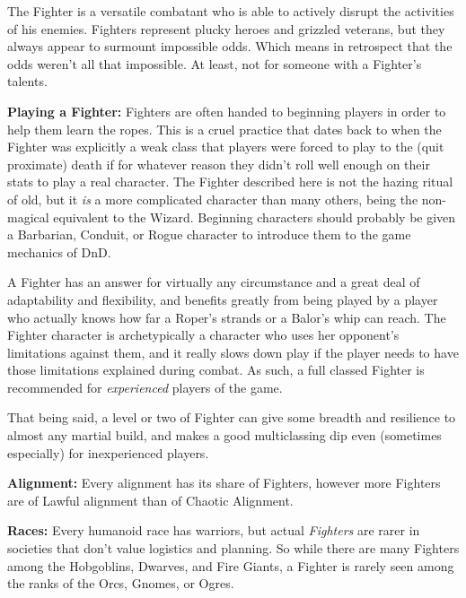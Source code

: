 
The Fighter is a versatile combatant who is able to actively disrupt the activities of his enemies. Fighters represent plucky heroes and grizzled veterans, but they always appear to surmount impossible odds. Which means in retrospect that the odds weren't all that impossible. At least, not for someone with a Fighter's talents.

\textbf{Playing a Fighter:} Fighters are often handed to beginning players in order to help them learn the ropes. This is a cruel practice that dates back to when the Fighter was explicitly a weak class that players were forced to play to the (quit proximate) death if for whatever reason they didn't roll well enough on their stats to play a real character. The Fighter described here is not the hazing ritual of old, but it \textit{is} a more complicated character than many others, being the non-magical equivalent to the Wizard. Beginning characters should probably be given a Barbarian, Conduit, or Rogue character to introduce them to the game mechanics of DnD.

A Fighter has an answer for virtually any circumstance and a great deal of adaptability and flexibility, and benefits greatly from being played by a player who actually knows how far a Roper's strands or a Balor's whip can reach. The Fighter character is archetypically a character who uses her opponent's limitations against them, and it really slows down play if the player needs to have those limitations explained during combat. As such, a full classed Fighter is recommended for \textit{experienced} players of the game.

That being said, a level or two of Fighter can give some breadth and resilience to almost any martial build, and makes a good multiclassing dip even (sometimes especially) for inexperienced players.

\textbf{Alignment:} Every alignment has its share of Fighters, however more Fighters are of Lawful alignment than of Chaotic Alignment.

\textbf{Races:} Every humanoid race has warriors, but actual \textit{Fighters} are rarer in societies that don't value logistics and planning. So while there are many Fighters among the Hobgoblins, Dwarves, and Fire Giants, a Fighter is rarely seen among the ranks of the Orcs, Gnomes, or Ogres.


